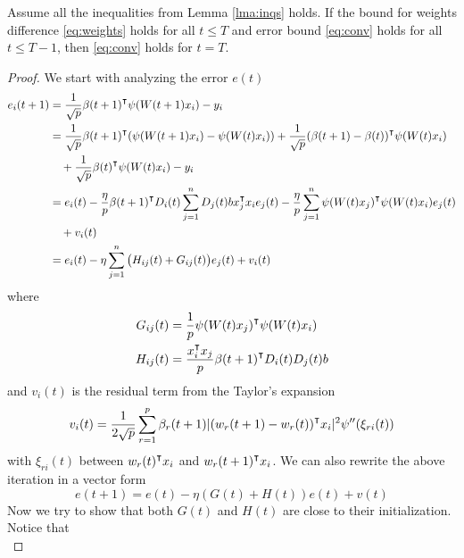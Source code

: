 \begin{lemma}
\label{lma:induction}
Assume all the inequalities from Lemma \ref{lma:inqs} holds. If the bound for weights difference \eqref{eq:weights} holds for all $t\leq T$ and error bound \eqref{eq:conv} holds for all $t\leq T-1$, then \eqref{eq:conv} holds for $t=T$.
\end{lemma}
\begin{proof}
We start with analyzing the error $e(t)$
\begin{equation*}
\begin{aligned}
    e_i(t+1) 
    &= \frac{1}{\sqrt p}\beta(t+1)\transpose\psi(W(t+1)x_i) - y_i \\
    &= \frac{1}{\sqrt p}\beta(t+1)\transpose(\psi(W(t+1)x_i)-\psi(W(t)x_i))+ \frac{1}{\sqrt p}(\beta(t+1)-\beta(t))\transpose \psi(W(t)x_i) \\
    & \quad + \frac{1}{\sqrt p}\beta(t)\transpose \psi(W(t)x_i) - y_i \\
    &=e_i(t) - \frac{\eta}{p}\beta(t+1)\transpose D_i(t)\sum_{j=1}^nD_j(t)b x_j\transpose x_i e_j(t)  - \frac{\eta}{p}\sum_{j=1}^n\psi(W(t)x_j)\transpose\psi(W(t)x_i)e_j(t) \\
    & \quad + v_i(t) \\
    & = e_i(t)-\eta\sum_{j=1}^n\big(H_{ij}(t)+G_{ij}(t)\big)e_j(t) + v_i(t)
\end{aligned}
\end{equation*}
where
\begin{equation}
\begin{aligned}
G_{ij}(t) &= \frac{1}{p}\psi(W(t)x_j)\transpose\psi(W(t)x_i) \\
H_{ij}(t) &= \frac{x_i\transpose x_j}{p}\beta(t+1)\transpose D_i(t)D_j(t)b
\end{aligned}
\end{equation}
and $v_i(t)$ is the residual term from the Taylor's expansion
\begin{equation}
    v_i(t) = \frac{1}{2\sqrt p}\sum_{r=1}^p\beta_r(t+1)|(w_r(t+1)-w_r(t))\transpose x_i|^2\psi''(\xi_{ri}(t))
\end{equation}
with $\xi_{ri}(t)$ between $w_r(t)\transpose x_i$ and $w_r(t+1)\transpose x_i$. We can also rewrite the above iteration in a vector form
\begin{equation}
\label{eq:et_iter}
     e(t+1) = e(t) - \eta(G(t)+H(t))e(t) + v(t)
\end{equation} 
Now we try to show that both $G(t)$ and $H(t)$ are close to their initialization. Notice that
\begin{equation*}

\end{equation*}
\end{proof}
